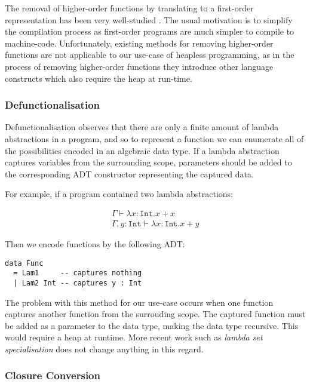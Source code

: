 \documentclass[runningheads]{llncs}
\begin{document}
The removal of higher-order functions by translating to a first-order representation has been very well-studied \cite{minamide1996typed,brandon2023better,chin1996higher}. The usual motivation is to simplify the compilation process as first-order programs are much simpler to compile to machine-code. Unfortunately, existing methods for removing higher-order functions are not applicable to our use-case of heapless programming, as in the process of removing higher-order functions they introduce other language constructs which also require the heap at run-time.

\subsubsection{Defunctionalisation}

Defunctionalisation observes that there are only a finite amount of lambda abstractions in a program, and so to represent a function we can enumerate all of the possibilities encoded in an algebraic data type. If a lambda abstraction captures variables from the surrounding scope, parameters should be added to the corresponding ADT constructor representing the captured data.

For example, if a program contained two lambda abstractions:

\begin{align}
  \Gamma \vdash \lambda x : \texttt{Int}. x + x \\
  \Gamma , y : \texttt{Int} \vdash \lambda x : \texttt{Int}. x + y
\end{align}

Then we encode functions by the following ADT:

\begin{verbatim}
data Func
  = Lam1     -- captures nothing
  | Lam2 Int -- captures y : Int
\end{verbatim}

The problem with this method for our use-case occurs when one function captures another function from the surrouding scope. The captured function must be added as a parameter to the data type, making the data type recursive. This would require a heap at runtime. More recent work such as \emph{lambda set specialisation} \cite{brandon2023better} does not change anything in this regard.

\subsubsection{Closure Conversion}
\end{document}
